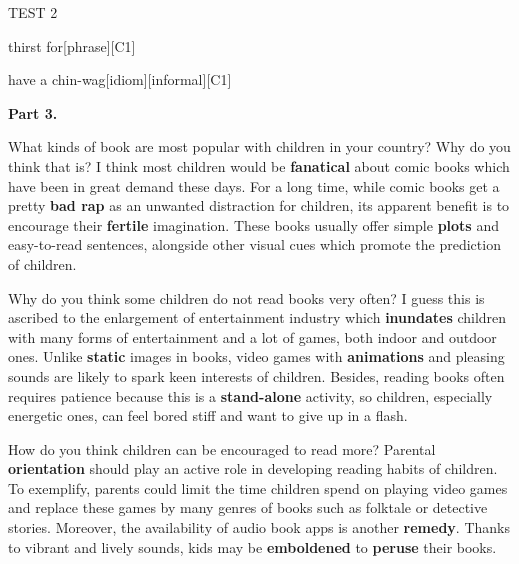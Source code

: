 \begin{glossarymc}[Cambridge 11]
\begin{test}{TEST 2}
\begin{VocabExplain}[Part 2]
            \begin{ExplainCard}{thirst for}[phrase][C1]
            \end{ExplainCard}

            \begin{ExplainCard}{have a chin-wag}[idiom][informal][C1]
            \end{ExplainCard}
        \end{VocabExplain}

    \noindent
    \textbf{Part 3.}
    \begin{qa}{What kinds of book are most popular with children in your country? Why do you think that is?}
    I think most children would be \textbf{fanatical} about comic books which have been in great demand these days. For a long time, while comic books get a pretty \textbf{bad rap} as an unwanted distraction for children, its apparent benefit is to encourage their \textbf{fertile} imagination. These books usually offer simple \textbf{plots} and easy-to-read sentences, alongside other visual cues which promote the prediction of children.
    \end{qa}

    \begin{qa}{Why do you think some children do not read books very often?}
    I guess this is ascribed to the enlargement of entertainment industry which \textbf{inundates} children with many forms of entertainment and a lot of games, both indoor and outdoor ones. Unlike \textbf{static} images in books, video games with \textbf{animations} and pleasing sounds are likely to spark keen interests of children. Besides, reading books often requires patience because this is a \textbf{stand-alone} activity, so children, especially energetic ones, can feel bored stiff and want to give up in a flash.
    \end{qa}

    \begin{qa}{How do you think children can be encouraged to read more?}
    Parental \textbf{orientation} should play an active role in developing reading habits of children. To exemplify, parents could limit the time children spend on playing video games and replace these games by many genres of books such as folktale or detective stories. Moreover, the availability of audio book apps is another \textbf{remedy}. Thanks to vibrant and lively sounds, kids may be \textbf{emboldened} to \textbf{peruse} their books.
    \end{qa}


\end{test}
\end{glossarymc}
